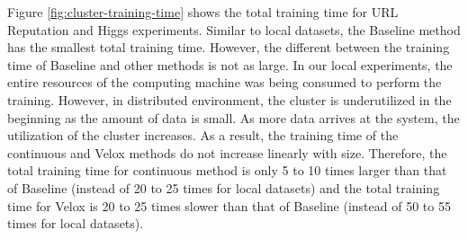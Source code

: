 \documentclass{vldb}
\begin{document}
{\color{green}Figure \ref{fig:cluster-training-time} shows the total training time for URL Reputation and Higgs experiments.
Similar to local datasets, the Baseline method has the smallest total training time.
However, the different between the training time of Baseline and other methods is not as large.
In our local experiments, the entire resources of the computing machine was being consumed to perform the training.
However, in distributed environment, the cluster is underutilized in the beginning as the amount of data is small.
As more data arrives at the system, the utilization of the cluster increases.
As a result, the training time of the continuous and Velox methods do not increase linearly with size.
Therefore, the total training time for continuous method is only 5 to 10 times larger than that of Baseline (instead of 20 to 25 times for local datasets) and the total training time for Velox is 20 to 25 times slower than that of Baseline (instead of 50 to 55 times for local datasets).}
\end{document}
